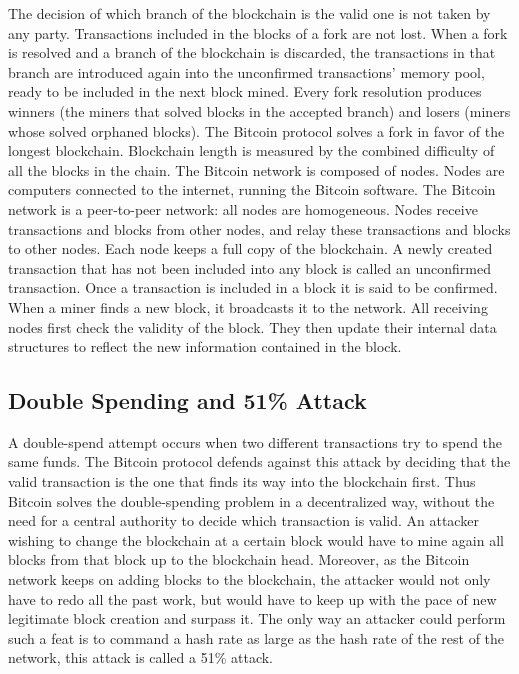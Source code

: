 \documentclass{article}
\begin{document}
The decision of which branch of the blockchain is the valid one is not taken by any party. Transactions included in the blocks of a fork are not lost. When a fork is resolved and a branch of the blockchain is discarded, the transactions in that branch are introduced again into the unconfirmed transactions’ memory pool, ready to be included in the next block mined. Every fork resolution produces winners (the miners that solved blocks in the accepted branch) and losers (miners whose solved orphaned blocks). The Bitcoin protocol solves a fork in favor of the longest blockchain. Blockchain length is measured by the combined difficulty of all the blocks in the chain.\newline
The Bitcoin network is composed of nodes. Nodes are computers connected to the internet, running the Bitcoin software. The Bitcoin network is a peer-to-peer network: all nodes are homogeneous. Nodes receive transactions and blocks from other nodes, and relay these transactions and blocks to other nodes. Each node keeps a full copy of the blockchain.\newline
A newly created transaction that has not been included into any block is called an unconfirmed transaction. Once a transaction is included in a block it is said to be confirmed. When a miner finds a new block, it broadcasts it to the network. All receiving nodes first check the validity of the block. They then update their internal data structures to reflect the new information contained in the block.

\subsection*{Double Spending and 51\% Attack}
A double-spend attempt occurs when two different transactions try to spend the same funds. The Bitcoin protocol defends against this attack by deciding that the valid transaction is the one that finds its way into the blockchain first. Thus Bitcoin solves the double-spending problem in a decentralized way, without the need for a central authority to decide which transaction is valid. An attacker wishing to change the blockchain at a certain block would have to mine again all blocks from that block up to the blockchain head. Moreover, as the Bitcoin network keeps on adding blocks to the blockchain, the attacker would not only have to redo all the past work, but would have to keep up with the pace of new legitimate block creation and surpass it. The only way an attacker could perform such a feat is to command a hash rate as large as the hash rate of the rest of the network, this attack is called a 51\% attack.
\end{document}
